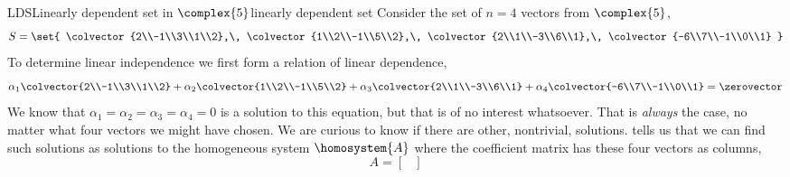 %
\begin{example}{LDS}{Linearly dependent set in $\complex{5}$}{linearly dependent set}
Consider the set of $n=4$ vectors from $\complex{5}$,
%
\begin{equation*}
S=\set{
\colvector{2\\-1\\3\\1\\2},\,
\colvector{1\\2\\-1\\5\\2},\,
\colvector{2\\1\\-3\\6\\1},\,
\colvector{-6\\7\\-1\\0\\1}
}
\end{equation*}
%
To determine linear independence we first form a relation of linear dependence,
%
\begin{equation*}
\alpha_1\colvector{2\\-1\\3\\1\\2}+
\alpha_2\colvector{1\\2\\-1\\5\\2}+
\alpha_3\colvector{2\\1\\-3\\6\\1}+
\alpha_4\colvector{-6\\7\\-1\\0\\1}
=\zerovector
\end{equation*}
%
We know that $\alpha_1=\alpha_2=\alpha_3=\alpha_4=0$ is a solution to this equation, but that is of no interest whatsoever.  That is {\em always} the case, no matter what four vectors we might have chosen.  We are curious to know if there are other, nontrivial, solutions.   tells us that we can find such solutions as solutions to the homogeneous system $\homosystem{A}$ where the coefficient matrix has these four vectors as columns,
%
\begin{equation*}
A=
\begin{bmatrix}

\end{bmatrix}
\end{equation*}
\end{example}
